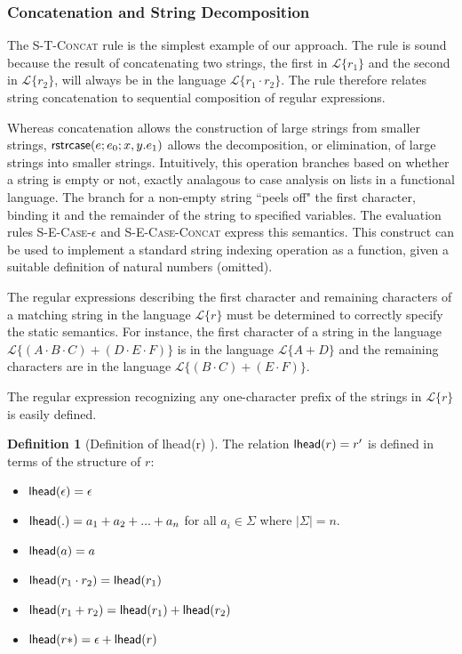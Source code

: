 \documentclass[9pt]{sig-alternate}
\theoremstyle{definition}
\newtheorem{defn}[thm]{Definition}
\newcommand{\Lagr}{\mathcal{L}}
\newcommand{\lang}[1]{\Lagr\{#1\}}
\newcommand{\strcase}[3]{ {\sf rstrcase}(#1; #2; #3)}
\newcommand{\lhead}[1]{ {\sf lhead}(#1) }
\begin{document}
\subsubsection{Concatenation and String Decomposition}

The \textsc{S-T-Concat} rule is the simplest example of our approach. The rule is sound because the result of concatenating two strings, the first in $\lang{r_1}$ and the second in $\lang{r_2}$, will always be in the language $\lang{r_1\cdot r_2}$. The rule therefore relates string concatenation to sequential composition of regular expressions.

Whereas concatenation allows the construction of large strings from smaller strings,  $\strcase{e}{e_0}{x,y.e_1}$  allows the decomposition, or elimination, of large strings into smaller strings. Intuitively, this operation branches based on whether a string is empty or not, exactly analagous to case analysis on lists in a functional language. The branch for a non-empty string ``peels off" the first character, binding it and the remainder of the string to specified variables. The evaluation rules \textsc{S-E-Case-$\epsilon$} and \textsc{S-E-Case-Concat} express this semantics. This construct can be used to implement a standard string indexing operation as a function, given a suitable definition of natural numbers (omitted).

The regular expressions describing the first character and remaining characters of a matching string in the language $\lang{r}$ must be determined to correctly specify the static semantics. For instance, the first character of a string in the language $\lang{(A\cdot B\cdot C)+(D\cdot E\cdot F)}$ is in the language $\lang{A+D}$ and the remaining characters are in the language $\lang{(B\cdot C)+(E \cdot F)}$. 


The regular expression recognizing any one-character prefix of the strings in $\lang{r}$ is easily defined.

\begin{defn}[Definition of \lhead{r}]
The relation $\lhead{r}=r'$ is defined in terms of the structure of $r$:
\begin{itemize}[noitemsep]
\item $\lhead{\epsilon} = \epsilon$
\item $\lhead{.} = a_1 + a_2 + ... + a_n$ for all $a_i \in \Sigma$ where $|\Sigma| = n$.
\item $\lhead{a} = a$ %
\item $\lhead{r_1\cdot r_2} = \lhead{r_1}$
\item $\lhead{r_1 +  r_2}  = \lhead{r_1} + \lhead{r_2}$
\item $\lhead{r*} = \epsilon + \lhead{r}$
\end{itemize}
\end{defn}
\end{document}
